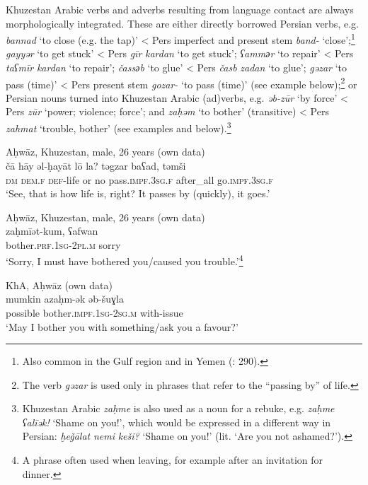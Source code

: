 \documentclass[output=paper,nonflat]{langsci/langscibook}
\begin{document}
Khuzestan Arabic verbs and adverbs resulting from language contact are always morphologically integrated. These are either directly borrowed Persian verbs, e.g. \textit{bannad} ‘to close (e.g. the tap)’ < Pers imperfect and present stem \textit{band-} ‘close’;\footnote{Also common in the Gulf region and in Yemen (\citealt{BehnstedtWoidich2014}: 290).} \textit{gayyər} ‘to get stuck’ <  Pers \textit{gīr} \textit{kardan} ‘to get stuck’; \textit{ʕamm{әr}} ‘to repair’ < Pers \textit{taʕmīr} \textit{kardan} ‘to repair’; \textit{čass{әb}} ‘to glue’ < Pers \textit{časb} \textit{zadan} ‘to glue’; \textit{gəzar} ‘to pass (time)’ < Pers present stem \textit{gozar-} ‘to pass (time)’ (see example  below);\footnote{The verb \textit{gəzar} is used only in phrases that refer to the “passing by” of life.} or Persian nouns turned into Khuzestan Arabic (ad)verbs, e.g. \textit{əb-zūr} ‘by force’ < Pers \textit{zūr} ‘power; violence; force’; and \textit{zaḥəm} ‘to bother’ (transitive) < Pers \textit{zahmat} ‘trouble, bother’ (see examples  and  below).\footnote{Khuzestan Arabic \textit{zaḥme} is also used as a noun for a rebuke, e.g. \textit{zaḥme} \textit{ʕalīək!} ‘Shame on you!’, which would be expressed in a different way in Persian: \textit{ḫeǧālat} \textit{nemi} \textit{keši?} ‘Shame on you!' (lit. ‘Are you not ashamed?’).}

\ea
{Aḥwāz, Khuzestan, male, 26 years (own data)}\\ \label{ca}
\gll čā hāy əl-ḥayāt lō la? təgzar baʕad, təmši\\
     \textsc{dm} \textsc{dem}.\textsc{f} \textsc{def}{}-life or no pass.\textsc{impf}.\textsc{3sg.f} after\_all go.\textsc{impf.3sg.f}\\
\glt ‘See, that is how life is, right? It passes by (quickly), it goes.’
\z

\ea \label{zah}
{Aḥwāz, Khuzestan, male, 26 years (own data)}\\
\gll zaḥmīət-kum, ʕafwan\\
     bother.\textsc{prf}.\textsc{1sg}{}-\textsc{2pl.m} sorry\\
\glt ‘Sorry, I must have bothered you/caused you trouble.’\footnote{A phrase often used when leaving, for example after an invitation for dinner.}
\z

\ea \label{mumkin}
{KhA, Aḥwāz (own data)}\\
\gll mumkin azaḥm-ək əb-šuɣla\\
     possible bother.\textsc{impf}.\textsc{1sg}{}-\textsc{2sg.m} with-issue\\
\glt ‘May I bother you with something/ask you a favour?’
\z
\end{document}
